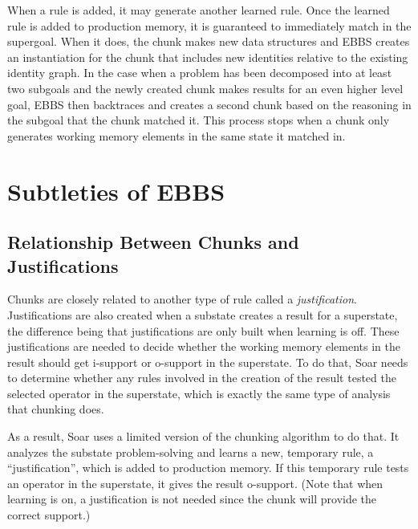When a rule is added, it may generate another learned rule. Once the learned rule is added to production memory, it is guaranteed to immediately match in the supergoal. When it does, the chunk makes new data structures and EBBS creates an instantiation for the chunk that includes new identities relative to the existing identity graph. In the case when a problem has been decomposed into at least two subgoals and the newly created chunk makes results for an even higher level goal, EBBS then backtraces and creates a second chunk based on the reasoning in the subgoal that the chunk matched it. This process stops when a chunk only generates working memory elements in the same state it matched in.

\section{Subtleties of EBBS}
\label{CHUNKING-subtleties}

\subsection{Relationship Between Chunks and Justifications}

Chunks are closely related to another type of rule called a \textit{justification}.  Justifications are also created when a substate creates a result for a superstate, the difference being that justifications are only built when learning is off.  These justifications are needed to decide whether the working memory elements in the result should get i-support or o-support in the superstate.  To do that, Soar needs to determine whether any rules involved in the creation of the result tested the selected operator in the superstate, which is exactly the same type of analysis that chunking does.

As a result, Soar uses a limited version of the chunking algorithm to do that.  It analyzes the substate problem-solving and learns a new, temporary rule, a ``justification'', which is added to production memory.  If this temporary rule tests an operator in the superstate, it gives the result o-support. (Note that when learning is on, a justification is not needed since the chunk will provide the correct support.)

